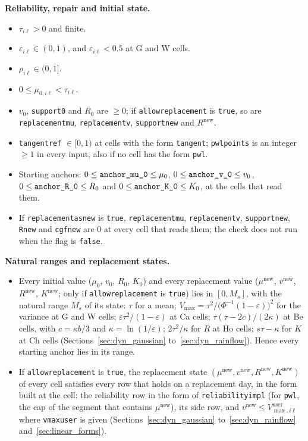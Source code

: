 \documentclass[11pt,a4paper]{article}
\theoremstyle{plain}
\theoremstyle{definition}
\newcommand{\new}{\mathrm{new}}
\renewcommand{\_}{\textunderscore\allowbreak{}}
\begin{document}
\textbf{Reliability, repair and initial state.}
\begin{itemize}[leftmargin=1.5em]
  \item $\tau_{i\ell} > 0$ and finite.
  \item $\varepsilon_{i\ell} \in (0, 1)$, and $\varepsilon_{i\ell} < 0.5$ at G and W cells.
  \item $\rho_{i\ell} \in (0, 1]$.
  \item $0 \le \mu_{0,i\ell} < \tau_{i\ell}$.
  \item $v_0$, \texttt{support\_0} and $R_0$ are $\ge 0$; if \texttt{allow\_replacement} is \texttt{true}, so are \texttt{replacement\_mu}, \texttt{replacement\_v}, \texttt{support\_new} and $R^{\new}$.
  \item \texttt{tangent\_ref} $\in [0, 1)$ at cells with the form \texttt{tangent}; \texttt{pwl\_points} is an integer $\ge 1$ in every input, also if no cell has the form \texttt{pwl}.
  \item Starting anchors: $0 \le \texttt{anchor\_mu\_0} \le \mu_0$, $0 \le \texttt{anchor\_v\_0} \le v_0$, $0 \le \texttt{anchor\_R\_0} \le R_0$ and $0 \le \texttt{anchor\_K\_0} \le K_0$, at the cells that read them.
  \item If \texttt{replacement\_as\_new} is \texttt{true}, \texttt{replacement\_mu}, \texttt{replacement\_v}, \texttt{support\_new}, \texttt{R\_new} and \texttt{cgf\_new} are $0$ at every cell that reads them; the check does not run when the flag is \texttt{false}.
\end{itemize}

\textbf{Natural ranges and replacement states.}
\begin{itemize}[leftmargin=1.5em]
  \item Every initial value ($\mu_0$, $v_0$, $R_0$, $K_0$) and every replacement value ($\mu^{\new}$, $v^{\new}$, $R^{\new}$, $K^{\new}$; only if \texttt{allow\_replacement} is \texttt{true}) lies in $[0, M_s]$, with the natural range $M_s$ of its state: $\tau$ for a mean; $V_{\max} = \tau^2/\bigl(\Phi^{-1}(1-\varepsilon)\bigr)^2$ for the variance at G and W cells; $\varepsilon\tau^2/(1-\varepsilon)$ at Ca cells; $\tau(\tau - 2c)/(2\kappa)$ at Be cells, with $c = \kappa b/3$ and $\kappa = \ln(1/\varepsilon)$; $2\tau^2/\kappa$ for $R$ at Ho cells; $s\tau - \kappa$ for $K$ at Ch cells (Sections~\ref{sec:dyn_gaussian} to~\ref{sec:dyn_rainflow}). Hence every starting anchor lies in its range.
  \item If \texttt{allow\_replacement} is \texttt{true}, the replacement state $(\mu^{\new}, v^{\new}, R^{\new}, K^{\new})$ of every cell satisfies every row that holds on a replacement day, in the form built at the cell: the reliability row in the form of \texttt{reliability\_impl} (for \texttt{pwl}, the cap of the segment that contains $\mu^{\new}$), its side row, and $v^{\new} \le V^{\mathrm{user}}_{\max,i\ell}$ where \texttt{v\_max\_user} is given (Sections~\ref{sec:dyn_gaussian} to~\ref{sec:dyn_rainflow} and~\ref{sec:linear_forms}).
\end{itemize}
\end{document}
